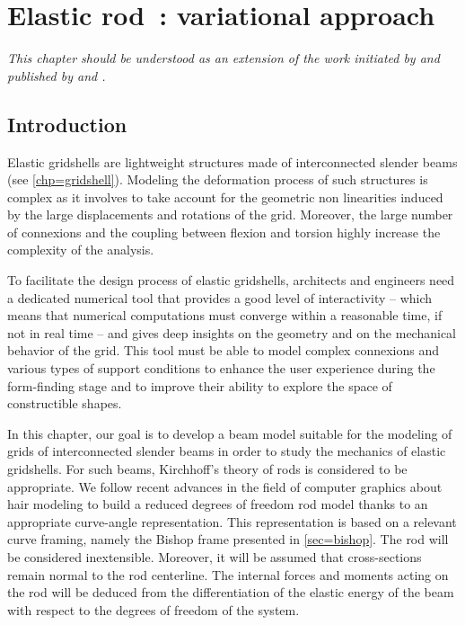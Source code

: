 
\newrefsegment
{}
\chapter{Elastic rod~: variational approach}\label{chp=energy}

{\itshape This chapter should be understood as an extension of the work initiated by  and published by  and .}

\section{Introduction}

Elastic gridshells are lightweight structures made of interconnected slender beams (see \cref{chp=gridshell}). Modeling the deformation process of such structures is complex as it involves to take account for the geometric non linearities induced by the large displacements and rotations of the grid. Moreover, the large number of connexions and the coupling between flexion and torsion highly increase the complexity of the analysis.

To facilitate the design process of elastic gridshells, architects and engineers need a dedicated numerical tool that provides a good level of interactivity -- which means that numerical computations must converge within a reasonable time, if not in real time -- and gives deep insights on the geometry and on the mechanical behavior of the grid. This tool must be able to model complex connexions and various types of support conditions to enhance the user experience during the form-finding stage and to improve their ability to explore the space of constructible shapes.

In this chapter, our goal is to develop a beam model suitable for the modeling of grids of interconnected slender beams in order to study the mechanics of elastic gridshells. For such beams, Kirchhoff's theory of rods is considered to be appropriate. We follow recent advances in the field of computer graphics about hair modeling \cite{Bergou2008} to build a reduced degrees of freedom rod model thanks to an appropriate curve-angle representation. This representation is based on a relevant curve framing, namely the Bishop frame presented in \cref{sec=bishop}. The rod will be considered inextensible. Moreover, it will be assumed that cross-sections remain normal to the rod centerline. The internal forces and moments acting on the rod will be deduced from the differentiation of the elastic energy of the beam with respect to the degrees of freedom of the system.

